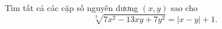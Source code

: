 \ifshowproblem
\begin{problem}\label{example:GER-2015-TST-P4}
	Tìm tất cả các cặp số nguyên dương \((x, y)\) sao cho
	\[
		\sqrt[3]{7x^2 - 13xy + 7y^2} = |x - y| + 1.
	\]
\end{problem}
\fi

\footnotemark
{}
\fi